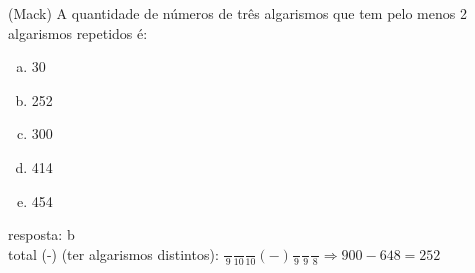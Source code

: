 \begin{ex}
(Mack) A quantidade de números de três algarismos que tem pelo menos 2 algarismos repetidos é:
   \begin{enumerate}[(a)]
   \item 30
   \item 252
   \item 300
   \item 414
   \item 454
   \end{enumerate}
     \begin{sol}
      resposta: b \\
      total (-) (ter algarismos distintos): \hspace{0,4cm}
      $ \frac{\phantom{A}}{9}\frac{\phantom{A}}{10}\frac{\phantom{A}}{10}(-)\frac{\phantom{A}}{9}\frac{\phantom{A}}{9}\frac{\phantom{A}}{8} \Longrightarrow 900-648=252$
     \end{sol}
\end{ex}